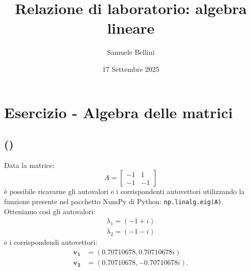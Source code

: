 \documentclass[a4paper]{article}
\newcounter{count_es}
\newcounter{count_sub_es}[count_es]
\begin{document}
\title{Relazione di laboratorio: algebra lineare}
\author{Samuele Bellini}
\date{17 Settembre 2025}
\maketitle

\section*{Esercizio  - Algebra delle matrici}

\subsection*{ ()}
Data la matrice:
\[A = \begin{bmatrix}
        -1 & 1 \\
        -1 & -1 
    \end{bmatrix}\]
è possibile ricavarne gli autovalori e i corrispondenti 
autovettori utilizzando la funzione presente nel  pacchetto 
NumPy di Python: \lstinline{np.linalg.eig(A)}. \\
Otteniamo così gli autovalori:
\begin{subequations}    
    \begin{align*}
        \lambda_{1} = (-1+i)\\
        \lambda_{2} = (-1-i)
    \end{align*}
\end{subequations}
e i corrispondendi autovettori:
\begin{subequations}    
    \begin{align*}
        \mathbf{v_{1}} &= (0.70710678, 0.70710678i)\\
        \mathbf{v_{2}} &= (0.70710678, -0.70710678i).
    \end{align*}
\end{subequations}
\end{document}
